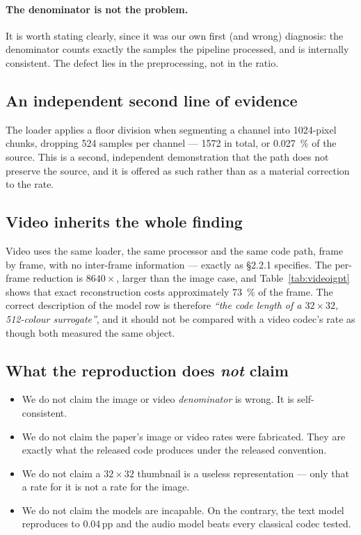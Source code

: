 \documentclass[11pt,a4paper]{article}
\begin{document}
\paragraph{The denominator is not the problem.} It is worth stating clearly, since
it was our own first (and wrong) diagnosis: the denominator counts exactly the
samples the pipeline processed, and is internally consistent. The defect lies in
the preprocessing, not in the ratio.

\subsection{An independent second line of evidence}

The loader applies a floor division when segmenting a channel into
\num{1024}-pixel chunks, dropping \num{524} samples per channel --- \num{1572} in
total, or \SI{0.027}{\%} of the source. This is a second, independent
demonstration that the path does not preserve the source, and it is offered as
such rather than as a material correction to the rate.

\subsection{Video inherits the whole finding}

Video uses the same loader, the same processor and the same code path, frame by
frame, with no inter-frame information --- exactly as \S2.2.1 specifies. The
per-frame reduction is $\num{8640}\times$, larger than the image case, and
Table~\ref{tab:videoigpt} shows that exact reconstruction costs approximately
\SI{73}{\%} of the frame. The correct description of the model row is
therefore \emph{``the code length of a $32\times32$, 512-colour surrogate''}, and
it should not be compared with a video codec's rate as though both measured the
same object.

\subsection{What the reproduction does \emph{not} claim}

\begin{itemize}[leftmargin=1.4em,itemsep=2pt]
\item We do not claim the image or video \emph{denominator} is wrong. It is
      self-consistent.
\item We do not claim the paper's image or video rates were fabricated. They are
      exactly what the released code produces under the released convention.
\item We do not claim a $32\times32$ thumbnail is a useless representation ---
      only that a rate for it is not a rate for the image.
\item We do not claim the models are incapable. On the contrary, the text model
      reproduces to \num{0.04}\,pp and the audio model beats every classical
      codec tested.
\end{itemize}
\end{document}
